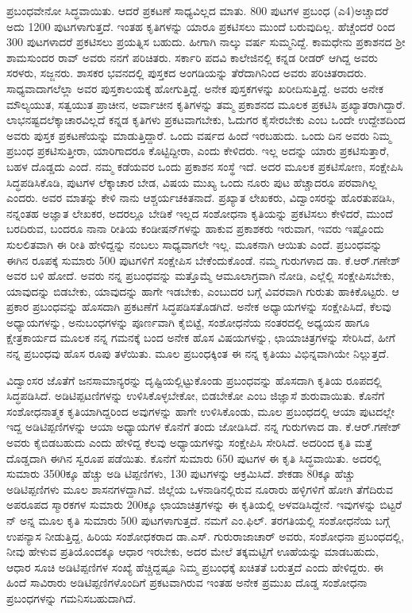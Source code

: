 ಪ್ರಬಂಧವೇನೋ ಸಿದ್ಧವಾಯಿತು. ಆದರೆ ಪ್ರಕಟಣೆ ಸಾಧ್ಯವಿಲ್ಲದ ಮಾತು. 800 ಪುಟಗಳ ಪ್ರಬಂಧ (ಎ4)\break ಅಚ್ಚಾದರೆ ಅದು 1200 ಪುಟಗಳಾಗುತ್ತದೆ. ಇಂತಹ ಕೃತಿಗಳನ್ನು ಯಾರೂ ಪ್ರಕಟಿಸಲು ಮುಂದೆ ಬರುವುದಿಲ್ಲ. ಹೆಚ್ಚೆಂದರೆ ರಿಂದ 300 ಪುಟಗಳಾದರೆ ಪ್ರಕಟಿಸಲು ಪ್ರಯತ್ನಿಸ ಬಹುದು. ಹೀಗಾಗಿ ನಾಲ್ಕು ವರ್ಷ ಸುಮ್ಮನಿದ್ದೆ. ಕಾಮಧೇನು ಪ್ರಕಾಶನದ ಶ‍್ರೀ ಶಾಮಸುಂದರ ರಾವ್​ ಅವರು ನನಗೆ ಪರಿಚಿತರು. ಸರ್ಕಾರಿ ಪದವಿ ಕಾಲೇಜಿನಲ್ಲಿ ಕನ್ನಡ ರೀಡರ್​ ಆಗಿದ್ದ ಅವರು ಸರಳರು, ಸಜ್ಜನರು. ಶಾಸಕರ ಭವನದಲ್ಲಿ ಪುಸ್ತಕದ ಅಂಗಡಿಯನ್ನು ತೆರೆದಾಗಿನಿಂದ ಅವರು ಪರಿಚಿತರಾದರು. ಸಾಧ್ಯವಾದಾಗಲೆಲ್ಲಾ ಅವರ ಪುಸ್ತಕಾಲಯಕ್ಕೆ ಹೋಗುತ್ತಿದ್ದೆ. ಅನೇಕ ಪುಸ್ತಕಗಳನ್ನು ಖರೀದಿಸುತ್ತಿದ್ದೆ. ಅವರು ಅನೇಕ ಮೌಲ್ಯಯುತ, ಸತ್ವಯುತ ಪ್ರಾಚೀನ, ಅರ್ವಾಚೀನ ಕೃತಿಗಳನ್ನು ತಮ್ಮ ಪ್ರಕಾಶನದ ಮೂಲಕ ಪ್ರಕಟಿಸಿ ಪ್ರಖ್ಯಾತರಾಗಿದ್ದಾರೆ. ಲಾಭನಷ್ಟದ\break ಲೆಕ್ಕಾಚಾರವಿಲ್ಲದೆ ಕನ್ನಡ ಕೃತಿಗಳು ಪ್ರಕಟವಾಗಬೇಕು, ಓದುಗರ ಕೈಸೇರಬೇಕು ಎಂಬ ಒಂದೇ ಉದ್ದೇಶದಿಂದ ಅವರು ಪುಸ್ತಕ ಪ್ರಕಟಣೆಯನ್ನು ಮಾಡುತ್ತಿದ್ದಾರೆ. ಒಂದು ವರ್ಷದ ಹಿಂದೆ ಇರಬಹುದು. ಒಂದು ದಿನ ಅವರು ನಿಮ್ಮ ಪ್ರಬಂಧ ಪ್ರಕಟಿಸು\-ತ್ತೀರಾ, ಯಾರಿಗಾದರೂ ಕೊಟ್ಟಿದ್ದೀರಾ, ಎಂದು ಕೇಳಿದರು. ಇಲ್ಲ ಅದನ್ನು ಯಾರು ಪ್ರಕಟಿಸುತ್ತಾರೆ, ಬಹಳ ದೊಡ್ಡದು ಎಂದೆ. ನಮ್ಮ ಕಡೆಯವರ ಒಂದು ಪ್ರಕಾಶನ ಸಂಸ್ಥೆ ಇದೆ. ಅದರ ಮೂಲಕ ಪ್ರಕಟಿಸೋಣ, ಸಂಕ್ಷೇಪಿಸಿ ಸಿದ್ಧಪಡಿಸಿಕೊಡಿ, ಪುಟಗಳ ಲೆಕ್ಕಾಚಾರ ಬೇಡ, ವಿಷಯ ಮುಖ್ಯ ಒಂದು ನೂರು ಪುಟ ಹೆಚ್ಚಾದರೂ ಪರವಾಗಿಲ್ಲ ಎಂದರು. ಅವರ ಮಾತನ್ನು ಕೇಳಿ ನಾನು ಆಶ್ಚರ್ಯಚಕಿತನಾದೆ. ಪ್ರಖ್ಯಾತ ಲೇಖಕರು, ವಿದ್ವಾಂಸರನ್ನು ಹೊರತುಪಡಿಸಿ, ನನ್ನಂತಹ ಅಜ್ಞಾತ ಲೇಖಕರ, ಅದರಲ್ಲೂ ಬೇಡಿಕೆ ಇಲ್ಲದ ಸಂಶೋಧನಾ ಕೃತಿಯನ್ನು ಪ್ರಕಟಿಸಲು ಕೇಳಿದರೆ, ಮುಂದೆ ಬರದಿರುವ, ಬಂದರೂ ನಾನಾ ರೀತಿಯ ಕಂಡೀಷನ್​ಗಳನ್ನು ಹಾಕುವ ಪ್ರಕಾಶಕರು ಇರುವಾಗ, ಇವರು ಇಷ್ಟೊಂದು ಸುಲಲಿತವಾಗಿ ಈ ರೀತಿ ಹೇಳಿದ್ದನ್ನು ನಂಬಲು ಸಾಧ್ಯವಾಗಲೇ ಇಲ್ಲ. ಮೂಕನಾಗಿ ಆಯಿತು ಎಂದೆ. ಪ್ರಬಂಧವನ್ನು ಈಗಿನ ರೂಪಕ್ಕೆ ಸುಮಾರು 500 ಪುಟಗಳಿಗೆ ಸಂಕ್ಷೇಪಿಸ ಬೇಕೆಂದುಕೊಂಡೆ. ನಮ್ಮ ಗುರುಗಳಾದ ಡಾ. ಕೆ.ಆರ್​.ಗಣೇಶ್​ ಅವರ ಬಳಿ ಹೋದೆ. ಅವರು ನನ್ನ ಪ್ರಬಂಧವನ್ನು ಮತ್ತೊಮ್ಮೆ ಆಮೂಲಾಗ್ರವಾಗಿ ನೋಡಿ, ಎಲ್ಲೆಲ್ಲಿ ಸಂಕ್ಷೇಪಿಸಬೇಕು, ಯಾವುದನ್ನು ಬಿಡಬೇಕು, ಯಾವುದನ್ನು ಹಾಗೇ ಇಡಬೇಕು, ಎಂಬುದರ ಬಗ್ಗೆ ವಿವರವಾಗಿ ಗುರುತು ಹಾಕಿಕೊಟ್ಟರು. ಆ ಪ್ರಕಾರ ಪ್ರಬಂಧವನ್ನು ಹೊಸದಾಗಿ ಪ್ರಕಟಣೆಗೆ ಸಿದ್ಧಪಡಿಸತೊಡಗಿದೆ. ಅನೇಕ ಅಧ್ಯಾಯಗಳನ್ನು ಸಂಕ್ಷೇಪಿಸಿದೆ, ಕೆಲವು ಅಧ್ಯಾಯಗಳನ್ನು, ಅನುಬಂಧಗಳನ್ನು ಪೂರ್ಣವಾಗಿ ಕೈಬಿಟ್ಟೆ, ಸಂಶೋಧನೆಯ ನಂತರದಲ್ಲಿ ಅಧ್ಯಯನ ಹಾಗೂ ಕ್ಷೇತ್ರಕಾರ್ಯದ ಮೂಲಕ ನನ್ನ ಗಮನಕ್ಕೆ ಬಂದ ಅನೇಕ ಹೊಸ ವಿಷಯಗಳನ್ನು, ಛಾಯಾಚಿತ್ರಗಳನ್ನು ಸೇರಿಸಿದೆ, ಹೀಗೆ ನನ್ನ ಪ್ರಬಂಧವು ಹೊಸ ರೂಪು ತಳೆಯಿತು. ಮೂಲ ಪ್ರಬಂಧಕ್ಕಿಂತ ಈ ನನ್ನ ಕೃತಿಯು ವಿಭಿನ್ನವಾಗಿಯೇ ನಿಲ್ಲುತ್ತದೆ.

ವಿದ್ವಾಂಸರ ಜೊತೆಗೆ ಜನಸಾಮಾನ್ಯರನ್ನು ದೃಷ್ಟಿಯಲ್ಲಿಟ್ಟುಕೊಂಡು ಪ್ರಬಂಧವನ್ನು ಹೊಸದಾಗಿ ಕೃತಿಯ ರೂಪದಲ್ಲಿ ಸಿದ್ಧಪಡಿಸಿದೆ. ಅಡಿಟಿಪ್ಪಟಣಿಗಳನ್ನು ಉಳಿಸಿಕೊಳ್ಳಬೇಕೋ, ಬಿಡಬೇಕೋ ಎಂಬ ಜಿಜ್ಞಾಸೆ ಶುರುವಾಯಿತು. ಕೊನೆಗೆ ಸಂಶೋಧನಾತ್ಮಕ ಕೃತಿಯಾಗಿದ್ದರಿಂದ ಅವುಗಳನ್ನು ಹಾಗೇ ಉಳಿಸಿಕೊಂಡು, ಮೂಲ ಪ್ರಬಂಧದಲ್ಲಿ ಆಯಾ ಪುಟದಲ್ಲೇ ಇದ್ದ ಅಡಿಟಿಪ್ಪಣಿಗಳನ್ನು ಆಯಾ ಅಧ್ಯಾಯಗಳ ಕೊನೆಗೆ ತಂದು ಜೋಡಿಸಿದೆ. ನನ್ನ ಗುರುಗಳಾದ ಡಾ. ಕೆ.ಆರ್​.ಗಣೇಶ್​ ಅವರು ಕೈಬಿಡಬಹುದು ಎಂದು ಹೇಳಿದ್ದ ಕೆಲವು ಅಧ್ಯಾಯಗಳನ್ನು ಸಂಕ್ಷೇಪಿಸಿ ಸೇರಿಸಿದೆ. ಅದರಿಂದ ಕೃತಿ ಮತ್ತೆ ದೊಡ್ಡದಾಗಿ ಈಗಿನ ಸ್ವರೂಪ ಪಡೆಯಿತು. ಕೊನೆಗೆ ಸುಮಾರು 650 ಪುಟಗಳ ಈ ಕೃತಿ ಸಿದ್ಧವಾಯಿತು. ಅದರಲ್ಲಿ ಸುಮಾರು 3500ಕ್ಕೂ ಹೆಚ್ಚು ಅಡಿ ಟಿಪ್ಪಣಿಗಳು, 130 ಪುಟಗಳನ್ನು ಆಕ್ರಮಿಸಿದೆ. ಶೇಕಡಾ 80ಕ್ಕೂ ಹೆಚ್ಚು ಅಡಿಟಿಪ್ಪಣಿಗಳು ಮೂಲ ಶಾಸನಗಳದ್ದಾಗಿವೆ. ಜಿಲ್ಲೆಯ ಒಳನಾಡಿನಲ್ಲಿರುವ ನೂರಾರು ಹಳ್ಳಿಗಳಿಗೆ ಹೋಗಿ ತೆಗೆದಿರುವ ಅಪರೂಪದ ಸ್ಮಾರಕಗಳ ಸುಮಾರು 200ಕ್ಕೂ ಛಾಯಾಚಿತ್ರಗಳನ್ನು ಈ ಕೃತಿಯಲ್ಲಿ ಅಳವಡಿಸಿದ್ದೇನೆ. ಇವುಗಳನ್ನು ಬಿಟ್ಟರೆ ನ್ ಅನ್ನ ಮೂಲ ಕೃತಿ ಸುಮಾರು 500 ಪುಟಗಳಾಗುತ್ತದೆ. ನಮಗೆ ಎಂ.ಫಿಲ್​. ತರಗತಿಯಲ್ಲಿ ಸಂಶೋಧನೆಯ ಬಗ್ಗೆ ಉಪನ್ಯಾಸ ನೀಡುತ್ತಿದ್ದ, ಹಿರಿಯ ಸಂಶೋಧಕರಾದ ಡಾ.ಎಸ್​. ಗುರುರಾಜಾಚಾರ್​ ಅವರು, ಸಂಶೋಧನಾ ಪ್ರಬಂಧದಲ್ಲಿ, ನೀವು ಹೇಳುವ ಪ್ರತಿಯೊಂದಕ್ಕೂ ಆಧಾರ ಇರಬೇಕು, ಅದರ ಮೇಲೆ ತಕ್ಕಮಟ್ಟಿಗೆ ಊಹೆಯನ್ನು ಮಾಡಬಹುದು, ಆಧಾರ ಸೂಚಿ ಅಡಿಟಿಪ್ಪಣಿಗಳ ಸಂಖ್ಯೆ ಹೆಚ್ಚಿದ್ದಷ್ಟೂ ನಿಮ್ಮ ಪ್ರಬಂಧಕ್ಕೆ ಖಚಿತತೆ ಬರುತ್ತದೆ ಎಂದು ಹೇಳಿದ್ದರು. ಈ ಹಿಂದೆ ಸಾವಿರಾರು ಅಡಿಟಿಪ್ಪಣಿಗಳೊಂದಿಗೆ ಪ್ರಕಟವಾಗಿರುವ ಇಂತಹ ಅನೇಕ ಪ್ರಮುಖ ದೊಡ್ಡ ಸಂಶೋಧನಾ ಪ್ರಬಂಧಗಳನ್ನು ಗಮನಿಸಬಹುದಾಗಿದೆ.

